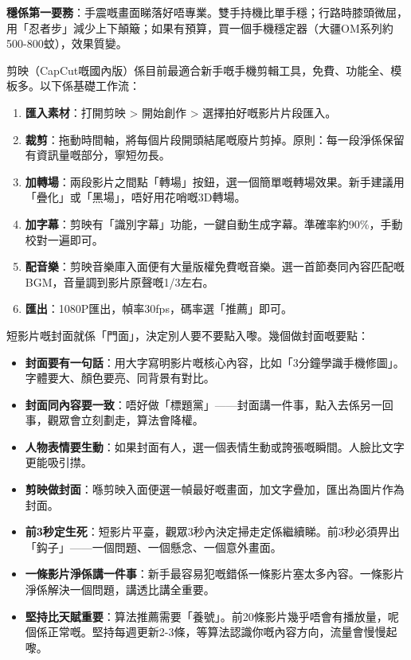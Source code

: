 \textbf{穩係第一要務}：手震嘅畫面睇落好唔專業。雙手持機比單手穩；行路時膝頭微屈，用「忍者步」減少上下顛簸；如果有預算，買一個手機穩定器（大疆OM系列約500-800蚊），效果質變。


剪映（CapCut嘅國內版）係目前最適合新手嘅手機剪輯工具，免費、功能全、模板多。以下係基礎工作流：

\begin{enumerate}
  \item \textbf{匯入素材}：打開剪映 > 開始創作 > 選擇拍好嘅影片片段匯入。
  \item \textbf{裁剪}：拖動時間軸，將每個片段開頭結尾嘅廢片剪掉。原則：每一段淨係保留有資訊量嘅部分，寧短勿長。
  \item \textbf{加轉場}：兩段影片之間點「轉場」按鈕，選一個簡單嘅轉場效果。新手建議用「疊化」或「黑場」，唔好用花哨嘅3D轉場。
  \item \textbf{加字幕}：剪映有「識別字幕」功能，一鍵自動生成字幕。準確率約90\%，手動校對一遍即可。
  \item \textbf{配音樂}：剪映音樂庫入面便有大量版權免費嘅音樂。選一首節奏同內容匹配嘅BGM，音量調到影片原聲嘅1/3左右。
  \item \textbf{匯出}：1080P匯出，幀率30fps，碼率選「推薦」即可。
\end{enumerate}


短影片嘅封面就係「門面」，決定別人要不要點入嚟。幾個做封面嘅要點：

\begin{itemize}
  \item \textbf{封面要有一句話}：用大字寫明影片嘅核心內容，比如「3分鐘學識手機修圖」。字體要大、顏色要亮、同背景有對比。
  \item \textbf{封面同內容要一致}：唔好做「標題黨」——封面講一件事，點入去係另一回事，觀眾會立刻劃走，算法會降權。
  \item \textbf{人物表情要生動}：如果封面有人，選一個表情生動或誇張嘅瞬間。人臉比文字更能吸引㩒。
  \item \textbf{剪映做封面}：喺剪映入面便選一幀最好嘅畫面，加文字疊加，匯出為圖片作為封面。
\end{itemize}


\begin{itemize}
  \item \textbf{前3秒定生死}：短影片平臺，觀眾3秒內決定掃走定係繼續睇。前3秒必須畀出「鈎子」——一個問題、一個懸念、一個意外畫面。
  \item \textbf{一條影片淨係講一件事}：新手最容易犯嘅錯係一條影片塞太多內容。一條影片淨係解決一個問題，講透比講全重要。
  \item \textbf{堅持比天賦重要}：算法推薦需要「養號」。前20條影片幾乎唔會有播放量，呢個係正常嘅。堅持每週更新2-3條，等算法認識你嘅內容方向，流量會慢慢起嚟。
\end{itemize}

